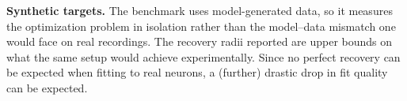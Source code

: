 \textbf{Synthetic targets.}
The benchmark uses model-generated data, so it measures the optimization problem in isolation rather than the model--data mismatch one would face on real recordings.
The recovery radii reported are upper bounds on what the same setup would achieve experimentally.
Since no perfect recovery can be expected when fitting to real neurons, a (further) drastic drop in fit quality can be expected.
